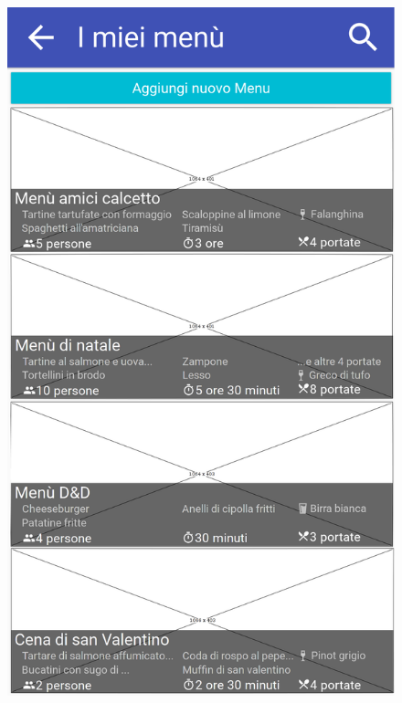 \begin{figure}[H]
\begin{minipage}{.49\textwidth}
		\includegraphics[width=\textwidth]{img/wireframe/i_miei_men_seleziona_menu.png}
	\end{minipage}
\end{figure}
